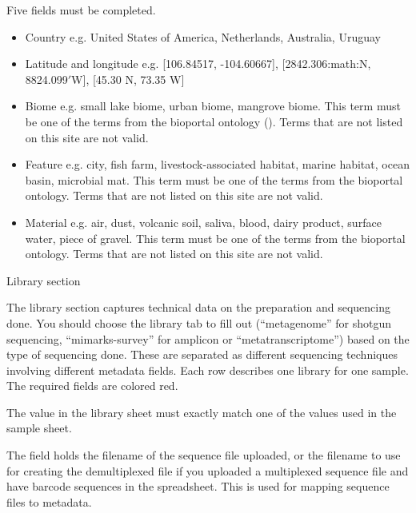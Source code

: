 \documentclass[letterpaper,10pt,english]{sphinxmanual}
\begin{document}
Five fields must be completed.
\begin{itemize}
\item {} 
Country \textendash{} e.g. United States of America, Netherlands, Australia,
Uruguay

\item {} 
Latitude and longitude \textendash{} e.g. {[}106.84517, -104.60667{]},
{[}2842.306:math:N, 8824.099\('\)W{]}, {[}45.30 N, 73.35 W{]}

\item {} 
Biome \textendash{} e.g. small lake biome, urban biome, mangrove biome. This term
must be one of the terms from the bioportal ontology
().
Terms that are not listed on this site are not valid.

\item {} 
Feature \textendash{} e.g. city, fish farm, livestock-associated habitat, marine
habitat, ocean basin, microbial mat. This term must be one of the
terms from the bioportal ontology. Terms that are not listed on this
site are not valid.

\item {} 
Material \textendash{} e.g. air, dust, volcanic soil, saliva, blood, dairy
product, surface water, piece of gravel. This term must be one of the
terms from the bioportal ontology. Terms that are not listed on this
site are not valid.

\end{itemize}

Library section

The library section captures technical data on the preparation and
sequencing done. You should choose the library tab to fill out
(“metagenome” for shotgun sequencing, “mimarks-survey” for amplicon or
“metatranscriptome”) based on the type of sequencing done. These are
separated as different sequencing techniques involving different
metadata fields. Each row describes one library for one sample. The
required fields are colored red.

The  value in the library sheet must exactly match one of
the values used in the sample sheet.

The  field holds the filename of the sequence file
uploaded, or the filename to use for creating the demultiplexed file if
you uploaded a multiplexed sequence file and have barcode sequences in
the spreadsheet. This is used for mapping sequence files to metadata.
\end{document}
